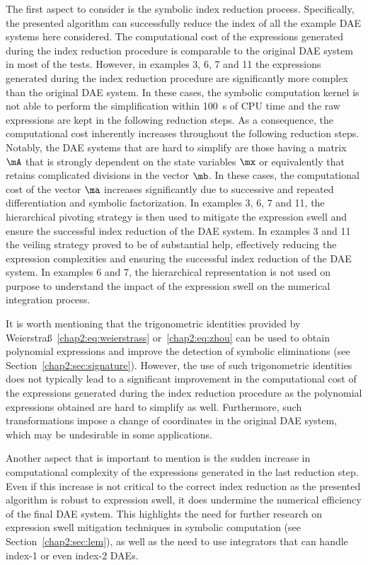 The first aspect to consider is the symbolic index reduction process. Specifically, the presented algorithm can successfully reduce the index of all the example \ac{DAE} systems here considered. The computational cost of the expressions generated during the index reduction procedure is comparable to the original \ac{DAE} system in most of the tests. However, in examples 3, 6, 7 and 11 the expressions generated during the index reduction procedure are significantly more complex than the original \ac{DAE} system. In these cases, the \Maple{} symbolic computation kernel is not able to perform the simplification within \SI{100}{\second} of CPU time and the raw expressions are kept in the following reduction steps. As a consequence, the computational cost inherently increases throughout the following reduction steps. Notably, the \ac{DAE} systems that are hard to simplify are those having a matrix $\mA$ that is strongly dependent on the state variables $\mx$ or equivalently that retains complicated divisions in the vector $\mb$. In these cases, the computational cost of the vector $\ma$ increases significantly due to successive and repeated differentiation and symbolic factorization. In examples 3, 6, 7 and 11, the hierarchical pivoting strategy is then used to mitigate the expression swell and ensure the successful index reduction of the \ac{DAE} system. In examples 3 and 11 the veiling strategy proved to be of substantial help, effectively reducing the expression complexities and ensuring the successful index reduction of the \ac{DAE} system. In examples 6 and 7, the hierarchical representation is not used on purpose to understand the impact of the expression swell on the numerical integration process.

It is worth mentioning that the trigonometric identities provided by Weierstra{\ss}~\eqref{chap2:eq:weierstrass} or~\eqref{chap2:eq:zhou} can be used to obtain polynomial expressions and improve the detection of symbolic eliminations (see Section~\ref{chap2:sec:signature}). However, the use of such trigonometric identities does not typically lead to a significant improvement in the computational cost of the expressions generated during the index reduction procedure as the polynomial expressions obtained are hard to simplify as well. Furthermore, such transformations impose a change of coordinates in the original \ac{DAE} system, which may be undesirable in some applications.

Another aspect that is important to mention is the sudden increase in computational complexity of the expressions generated in the last reduction step. Even if this increase is not critical to the correct index reduction as the presented algorithm is robust to expression swell, it does undermine the numerical efficiency of the final \ac{DAE} system. This highlights the need for further research on expression swell mitigation techniques in symbolic computation (see Section~\ref{chap2:sec:lem}), as well as the need to use integrators that can handle index-1 or even index-2 \acp{DAE}.

